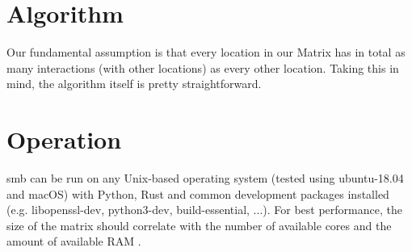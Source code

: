 

\section{Algorithm}\label{sec:algorithm}

 
Our fundamental assumption is that every location in our Matrix has in total as
many interactions (with other locations) as every other location.
Taking this in mind, the algorithm itself is pretty straightforward.


\section{Operation}
smb can be run on any Unix-based operating system (tested using ubuntu-18.04
and macOS) with Python, Rust and common development packages installed (e.g.
libopenssl-dev, python3-dev, build-essential, ...). For best performance, the
size of the matrix should correlate with the number of available cores and the
amount of available RAM .







